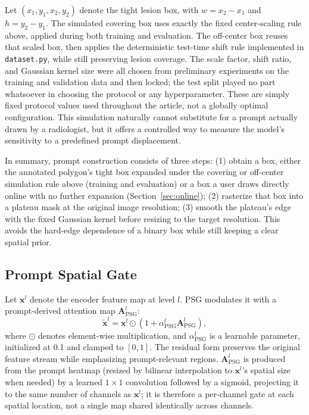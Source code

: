 Let $(x_1,y_1,x_2,y_2)$ denote the tight lesion box, with $w=x_2-x_1$ and $h=y_2-y_1$. The simulated covering box uses exactly the fixed center-scaling rule above, applied during both training and evaluation. The off-center box reuses that scaled box, then applies the deterministic test-time shift rule implemented in \texttt{dataset.py}, while still preserving lesion coverage. The scale factor, shift ratio, and Gaussian kernel size were all chosen from preliminary experiments on the training and validation data and then locked; the test split played no part whatsoever in choosing the protocol or any hyperparameter. These are simply fixed protocol values used throughout the article, not a globally optimal configuration. This simulation naturally cannot substitute for a prompt actually drawn by a radiologist, but it offers a controlled way to measure the model's sensitivity to a predefined prompt displacement.

In summary, prompt construction consists of three steps: (1) obtain a box, either the annotated polygon's tight box expanded under the covering or off-center simulation rule above (training and evaluation) or a box a user draws directly online with no further expansion (Section~\ref{sec:online}); (2) rasterize that box into a plateau mask at the original image resolution; (3) smooth the plateau's edge with the fixed Gaussian kernel before resizing to the target resolution. This avoids the hard-edge dependence of a binary box while still keeping a clear spatial prior.

\subsection{Prompt Spatial Gate}
Let $\mathbf{x}^{l}$ denote the encoder feature map at level $l$. PSG modulates it with a prompt-derived attention map $\mathbf{A}^{l}_{\mathrm{PSG}}$:
\begin{equation}
\widetilde{\mathbf{x}}^{l}
=
\mathbf{x}^{l}\odot
\left(1+\alpha^{l}_{\mathrm{PSG}}\mathbf{A}^{l}_{\mathrm{PSG}}\right),
\end{equation}
where $\odot$ denotes element-wise multiplication, and $\alpha^{l}_{\mathrm{PSG}}$ is a learnable parameter, initialized at 0.1 and clamped to $[0,1]$. The residual form preserves the original feature stream while emphasizing prompt-relevant regions. $\mathbf{A}^{l}_{\mathrm{PSG}}$ is produced from the prompt heatmap (resized by bilinear interpolation to $\mathbf{x}^{l}$'s spatial size when needed) by a learned $1\times1$ convolution followed by a sigmoid, projecting it to the same number of channels as $\mathbf{x}^{l}$; it is therefore a per-channel gate at each spatial location, not a single map shared identically across channels.

